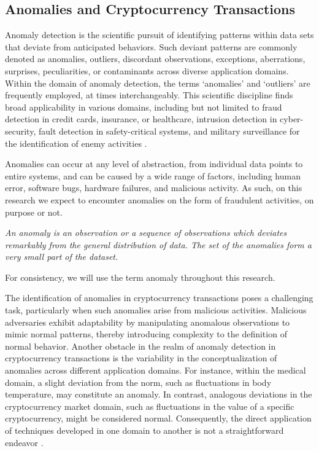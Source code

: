 \subsection{Anomalies and Cryptocurrency Transactions}
Anomaly detection is the scientific pursuit of identifying patterns within data sets that deviate from anticipated
behaviors. Such deviant patterns are commonly denoted as anomalies, outliers, discordant observations, exceptions,
aberrations, surprises, peculiarities, or contaminants across diverse application domains. Within the domain of anomaly
detection, the terms `anomalies' and `outliers' are frequently employed, at times interchangeably. This scientific
discipline finds broad applicability in various domains, including but not limited to fraud detection in credit cards,
insurance, or healthcare, intrusion detection in cyber-security, fault detection in safety-critical systems, and
military surveillance for the identification of enemy activities \cite{10.1145/1541880.1541882}.

Anomalies can occur at any level of abstraction, from individual data points to entire systems, and can be caused by a
wide range of factors, including human error, software bugs, hardware failures, and malicious activity. As such, on this
research we expect to encounter anomalies on the form of fraudulent activities, on purpose or not.

\begin{definition}
    \textit{An anomaly is an observation or a sequence of observations which deviates remarkably from the general distribution of data. The set of the anomalies form a very small part of the dataset.}
\end{definition}

For consistency, we will use the term anomaly throughout this research.

The identification of anomalies in cryptocurrency transactions poses a challenging task, particularly when such
anomalies arise from malicious activities. Malicious adversaries exhibit adaptability by manipulating anomalous
observations to mimic normal patterns, thereby introducing complexity to the definition of normal behavior. Another
obstacle in the realm of anomaly detection in cryptocurrency transactions is the variability in the conceptualization of
anomalies across different application domains. For instance, within the medical domain, a slight deviation from the
norm, such as fluctuations in body temperature, may constitute an anomaly. In contrast, analogous deviations in the
cryptocurrency market domain, such as fluctuations in the value of a specific cryptocurrency, might be considered
normal. Consequently, the direct application of techniques developed in one domain to another is not a straightforward
endeavor \cite{10.1145/1541880.1541882}.

